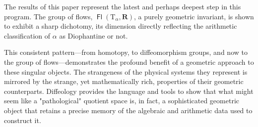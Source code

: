 \documentclass[10pt,letterpaper,reqno]{amsart}
\newcommand{\RR}{\mathbf{R}}
\newcommand{\T}{\mathrm{T}}
\DeclareMathOperator{\Fb}{\boldsymbol{\mathsf{Fl}}}
\begin{document}
    The results of this paper represent the latest and perhaps deepest step in this program. The group of flows, $\Fb(\T_\alpha, \RR)$, a purely geometric invariant, is shown to exhibit a sharp dichotomy, its dimension directly reflecting the arithmetic classification of $\alpha$ as Diophantine or not.
    
    This consistent pattern---from homotopy, to diffeomorphism groups, and now to the group of flows---demonstrates the profound benefit of a geometric approach to these singular objects. The strangeness of the physical systems they represent is mirrored by the strange, yet mathematically rich, properties of their geometric counterparts. Diffeology provides the language and tools to show that what might seem like a "pathological" quotient space is, in fact, a sophisticated geometric object that retains a precise memory of the algebraic and arithmetic data used to construct it.
    
    
\end{document}
